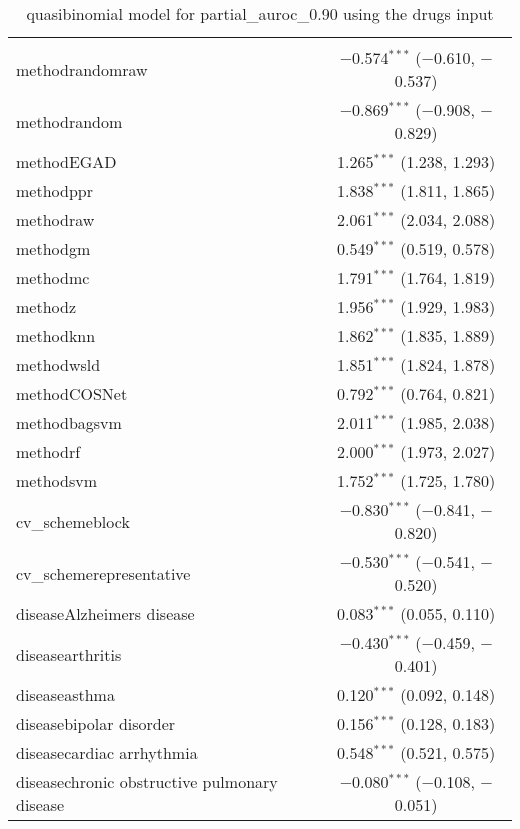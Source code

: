 
\begin{table}[!htbp] \centering 
  \caption{quasibinomial model for partial_auroc_0.90 using the drugs input} 
  \label{} 
\begin{tabular}{@{\extracolsep{5pt}}lc} 
\\[-1.8ex]\hline 
\hline \\[-1.8ex] 
 methodrandomraw & $-$0.574$^{***}$ ($-$0.610, $-$0.537) \\ 
  methodrandom & $-$0.869$^{***}$ ($-$0.908, $-$0.829) \\ 
  methodEGAD & 1.265$^{***}$ (1.238, 1.293) \\ 
  methodppr & 1.838$^{***}$ (1.811, 1.865) \\ 
  methodraw & 2.061$^{***}$ (2.034, 2.088) \\ 
  methodgm & 0.549$^{***}$ (0.519, 0.578) \\ 
  methodmc & 1.791$^{***}$ (1.764, 1.819) \\ 
  methodz & 1.956$^{***}$ (1.929, 1.983) \\ 
  methodknn & 1.862$^{***}$ (1.835, 1.889) \\ 
  methodwsld & 1.851$^{***}$ (1.824, 1.878) \\ 
  methodCOSNet & 0.792$^{***}$ (0.764, 0.821) \\ 
  methodbagsvm & 2.011$^{***}$ (1.985, 2.038) \\ 
  methodrf & 2.000$^{***}$ (1.973, 2.027) \\ 
  methodsvm & 1.752$^{***}$ (1.725, 1.780) \\ 
  cv\_schemeblock & $-$0.830$^{***}$ ($-$0.841, $-$0.820) \\ 
  cv\_schemerepresentative & $-$0.530$^{***}$ ($-$0.541, $-$0.520) \\ 
  diseaseAlzheimers disease & 0.083$^{***}$ (0.055, 0.110) \\ 
  diseasearthritis & $-$0.430$^{***}$ ($-$0.459, $-$0.401) \\ 
  diseaseasthma & 0.120$^{***}$ (0.092, 0.148) \\ 
  diseasebipolar disorder & 0.156$^{***}$ (0.128, 0.183) \\ 
  diseasecardiac arrhythmia & 0.548$^{***}$ (0.521, 0.575) \\ 
  diseasechronic obstructive pulmonary disease & $-$0.080$^{***}$ ($-$0.108, $-$0.051) \\ 

\end{tabular}
\end{table}
